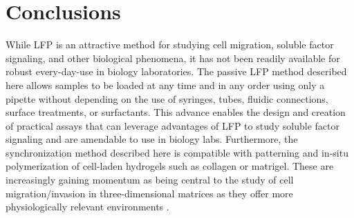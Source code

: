 
\section{Conclusions}

While LFP is an attractive method for studying cell migration, soluble factor signaling, and other biological phenomena, it has not been readily available for robust every-day-use in biology laboratories. The passive LFP method described here allows samples to be loaded at any time and in any order using only a pipette without depending on the use of syringes, tubes, fluidic connections, surface treatments, or surfactants. This advance enables the design and creation of practical assays that can leverage advantages of LFP to study soluble factor signaling and are amendable to use in biology labs. Furthermore, the synchronization method described here is compatible with patterning and in-situ polymerization of cell-laden hydrogels such as collagen or matrigel. These are increasingly gaining momentum as being central to the study of cell migration/invasion in three-dimensional matrices as they offer more physiologically relevant environments \cite{Sung:2010fk}.


